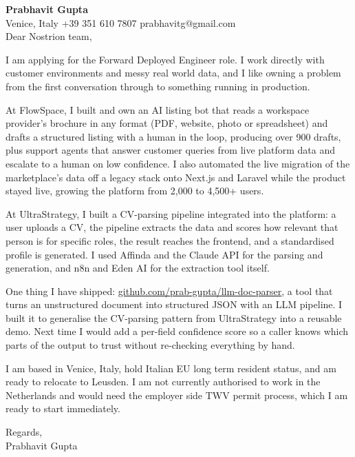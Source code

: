 \documentclass[a4paper,10.5pt]{article}
\begin{document}
\textbf{Prabhavit Gupta}\\
Venice, Italy \textbar{} +39 351 610 7807 \textbar{} prabhavitg@gmail.com\\[10pt]
Dear Nostrion team,

I am applying for the Forward Deployed Engineer role. I work directly with customer environments and messy real world data, and I like owning a problem from the first conversation through to something running in production.

At FlowSpace, I built and own an AI listing bot that reads a workspace provider's brochure in any format (PDF, website, photo or spreadsheet) and drafts a structured listing with a human in the loop, producing over 900 drafts, plus support agents that answer customer queries from live platform data and escalate to a human on low confidence. I also automated the live migration of the marketplace's data off a legacy stack onto Next.js and Laravel while the product stayed live, growing the platform from 2,000 to 4,500+ users.

At UltraStrategy, I built a CV-parsing pipeline integrated into the platform: a user uploads a CV, the pipeline extracts the data and scores how relevant that person is for specific roles, the result reaches the frontend, and a standardised profile is generated. I used Affinda and the Claude API for the parsing and generation, and n8n and Eden AI for the extraction tool itself.

One thing I have shipped: \href{https://github.com/prab-gupta/llm-doc-parser}{github.com/prab-gupta/llm-doc-parser}, a tool that turns an unstructured document into structured JSON with an LLM pipeline. I built it to generalise the CV-parsing pattern from UltraStrategy into a reusable demo. Next time I would add a per-field confidence score so a caller knows which parts of the output to trust without re-checking everything by hand.

I am based in Venice, Italy, hold Italian EU long term resident status, and am ready to relocate to Leusden. I am not currently authorised to work in the Netherlands and would need the employer side TWV permit process, which I am ready to start immediately.

Regards,\\
Prabhavit Gupta
\end{document}
